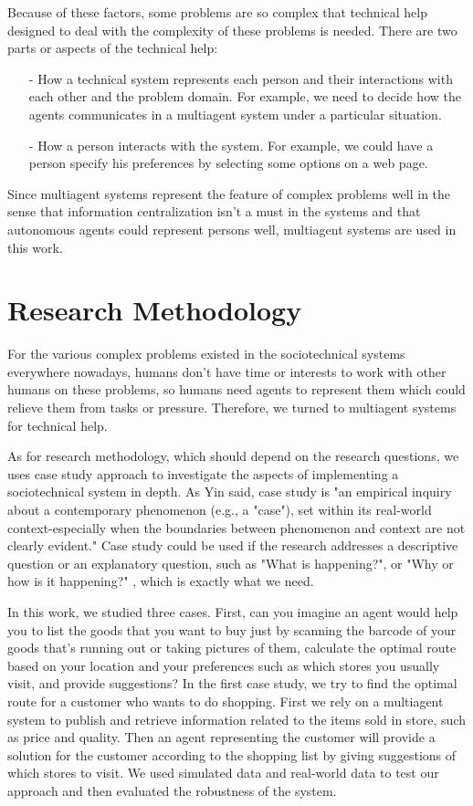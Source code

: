 Because of these factors, some problems are so complex that technical help designed to deal with the complexity of these problems is needed. There are two parts or aspects of the technical help: 
\begin{itemize}
\item[-]How a technical system represents each person and their interactions with each other and the problem domain. For example, we need to decide how the agents communicates in a multiagent system under a particular situation.
\item[-]How a person interacts with the system. For example, we could have a person specify his preferences by selecting some options on a web page.
\end{itemize}
Since multiagent systems represent the feature of complex problems well in the sense that information centralization isn't a must in the systems and that autonomous agents could represent persons well, multiagent systems are used in this work.

\section{Research Methodology}
\label{ch0:MotivatingExa}
For the various complex problems existed in the sociotechnical systems everywhere nowadays, humans don't have time or interests to work with other humans on these problems, so humans need agents to represent them which could relieve them from tasks or pressure. Therefore, we turned to multiagent systems for technical help. 

As for research methodology, which should depend on the research questions, we uses case study approach to investigate the aspects of implementing a sociotechnical system in depth. As Yin \cite{yin2009} said, case study is "an empirical inquiry about a contemporary phenomenon (e.g., a "case"), set within its real-world context-especially when the boundaries between phenomenon and context are not clearly evident." Case study could be used if the research addresses a descriptive question or an explanatory question, such as "What is happening?", or "Why or how is it happening?" \cite{shavelson2003}, which is exactly what we need. 

In this work, we studied three cases. First, can you imagine an agent would help you to list the goods that you want to buy just by scanning the barcode of your goods that's running out or taking pictures of them, calculate the optimal route based on your location and your preferences such as which stores you usually visit, and provide suggestions? In the first case study, we try to find the optimal route for a customer who wants to do shopping. First we rely on a multiagent system to publish and retrieve information related to the items sold in store, such as price and quality. Then an agent representing the customer will provide a solution for the customer according to the shopping list by giving suggestions of which stores to visit. We used simulated data and real-world data to test our approach and then evaluated the robustness of the system.

